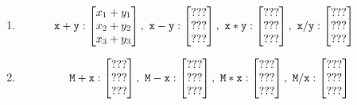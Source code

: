 \documentclass{jarticle}
\begin{document}
\begin{enumerate}
 \item 
	\begin{align*}
	 \text{\tt x} + \text{\tt y}
	 : 
	 \begin{bmatrix}
	  x_1 + y_1 \\
	  x_2 + y_2 \\
	  x_3 + y_3 
	 \end{bmatrix}, \
	 \text{\tt x} - \text{\tt y} &:
	 \begin{bmatrix}
	  ??? \\
	  ??? \\
	  ??? 
	 \end{bmatrix}, \
	 \text{\tt x} * \text{\tt y}
	 :
	 \begin{bmatrix}
	  ??? \\
	  ??? \\
	  ??? 
	 \end{bmatrix}, \ 
	 \text{\tt x} / \text{\tt y}
	 :
	 \begin{bmatrix}
	  ??? \\
	  ??? \\
	  ??? 
	 \end{bmatrix}
	\end{align*}

 \item 
	\begin{align*}
	 \text{\tt M} + \text{\tt x}:
	 \begin{bmatrix}
	  ??? \\
	  ??? \\
	  ??? 
	 \end{bmatrix}, \
	 \text{\tt M} - \text{\tt x}: 
	 \begin{bmatrix}
	  ??? \\
	  ??? \\
	  ??? 
	 \end{bmatrix}, \
	 \text{\tt M} * \text{\tt x}: 
	 \begin{bmatrix}
	  ??? \\
	  ??? \\
	  ??? 
	 \end{bmatrix}, \
	 \text{\tt M} / \text{\tt x}: 
	 \begin{bmatrix}
	  ??? \\
	  ??? \\
	  ??? 
	 \end{bmatrix}
	\end{align*}
	

\end{enumerate}
\end{document}
